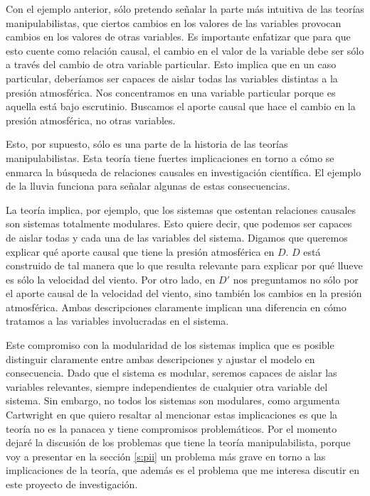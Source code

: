 {{Con el ejemplo anterior, sólo pretendo señalar la parte más
intuitiva de las teorías manipulabilistas, que ciertos
cambios en los valores de las variables provocan cambios en
los valores de otras variables. Es importante enfatizar que
para que esto cuente como relación causal, el cambio en el
valor de la variable debe ser sólo a través del cambio de
otra variable
particular. Esto implica que en un caso particular,
deberíamos ser capaces de aislar todas las variables
distintas a la presión atmosférica. Nos concentramos en una
variable particular porque es aquella está bajo escrutinio.
Buscamos el aporte causal que hace el cambio en la presión atmosférica, no otras
variables.

Esto, por supuesto, sólo es una parte de la historia de las
teorías manipulabilistas. Esta teoría tiene fuertes
implicaciones en torno a cómo se enmarca la búsqueda de
relaciones causales en investigación científica. El ejemplo
de la lluvia funciona para señalar algunas de estas
consecuencias.

La teoría implica, por ejemplo, que los sistemas que
ostentan relaciones causales son sistemas totalmente modulares. Esto
quiere decir, que podemos ser capaces de
aislar todas y cada una de las variables del sistema. Digamos que queremos explicar qué aporte causal que tiene la
presión atmosférica en $D$. $D$ está construido de tal
manera que lo que resulta relevante para explicar por qué
llueve es sólo la velocidad del viento. Por otro lado, en $D'$ nos preguntamos
no sólo por el aporte causal de la
velocidad del viento, sino también los cambios en la presión
atmosférica. Ambas descripciones claramente
implican una diferencia en cómo tratamos a las variables
involucradas en el sistema.

Este compromiso con la modularidad de los sistemas implica
que es posible distinguir claramente entre ambas descripciones y ajustar el modelo en consecuencia. Dado que el sistema es
modular, seremos capaces de aislar las variables relevantes, siempre
independientes de cualquier otra variable del sistema. Sin
embargo, no todos los sistemas son modulares, como argumenta Cartwright en %
que quiero resaltar al mencionar estas implicaciones es que
la teoría no es la panacea y tiene compromisos
problemáticos. Por el momento dejaré la discusión de los problemas que tiene
la teoría manipulabilista, porque voy a presentar en la sección \ref{s:pii}
un problema más grave en torno a las implicaciones de la
teoría, que además es el problema que me interesa discutir en este proyecto de
investigación.

}}
